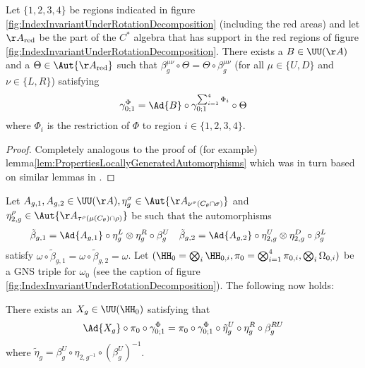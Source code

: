 \begin{lemma}\label{lem:DecompositionOfLGAInCross}
	Let $\{1,2,3,4\}$ be regions indicated in figure \ref{fig:IndexInvariantUnderRotationDecomposition} (including the red areas) and let $\AA_{\text{red}}$ be the part of the $C^*$ algebra that has support in the red regions of figure \ref{fig:IndexInvariantUnderRotationDecomposition}. There exists a $B\in\UU(\AA)$ and a $\Theta\in\Aut{\AA_{\text{red}}}$ such that $\beta^{\mu\nu}_g\circ\Theta=\Theta\circ\beta^{\mu\nu}_g$ (for all $\mu\in\{U,D\}$ and $\nu\in\{L,R\}$) satisfying
	\begin{equation}
		\gamma^\Phi_{0;1}=\Ad{B}\circ\gamma^{\sum_{i=1}^4\Phi_i}_{0;1}\circ\Theta
	\end{equation}
	where $\Phi_i$ is the restriction of $\Phi$ to region $i\in\{1,2,3,4\}$.
\end{lemma}
\begin{proof}
	Completely analogous to the proof of (for example) lemma\ref{lem:PropertiesLocallyGeneratedAutomorphisms} which was in turn based on similar lemmas in \cite{Ogata2d}.
\end{proof}
Let $A_{g,1},A_{g,2}\in\UU(\AA),\eta^\sigma_g\in\Aut{\AA_{\nu^{\sigma}(C_\theta\cap\sigma)}}$ and $\eta^\rho_{2,g}\in\Aut{\AA_{\tau^{\rho}(\mu(C_\theta)\cap\rho)}}$ be such that the automorphisms
\begin{align}
	\tilde{\beta}_{g,1}&=\Ad{A_{g,1}}\circ\eta_g^L\otimes\eta_g^R\circ\beta_g^U&\tilde{\beta}_{g,2}&=\Ad{A_{g,2}}\circ\eta_{2,g}^U\otimes\eta_{2,g}^D\circ\beta_g^L
\end{align}
satisfy $\omega\circ\tilde{\beta}_{g,1}=\omega\circ\tilde{\beta}_{g,2}=\omega$. Let $(\HH_0=\bigotimes_i\HH_{0,i},\pi_0=\bigotimes_{i=1}^4\pi_{0,i},\bigotimes_i\Omega_{0,i})$ be a GNS triple for $\omega_0$ (see the caption of figure \ref{fig:IndexInvariantUnderRotationDecomposition}). The following now holds:
\begin{lemma}\label{lem:DefinitionX_gLemma}
	There exists an $X_g\in\UU(\HH_0)$ satisfying that
	\begin{equation}\label{eq:DefinitionX_gLemma}
		\Ad{X_g}\circ\pi_0\circ\gamma^\Phi_{0;1}=\pi_0\circ\gamma^\Phi_{0;1}\circ\tilde{\eta}^U_g\circ\eta^R_g\circ\beta_g^{RU}
	\end{equation}
	where $\tilde{\eta}_g=\beta_g^U\circ\eta_{2,g^{-1}}\circ(\beta_g^U)^{-1}$.
\end{lemma}
